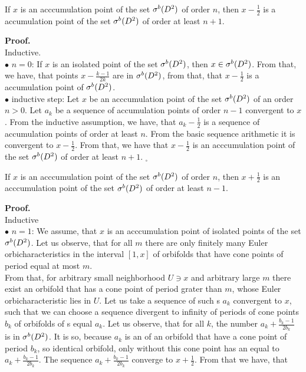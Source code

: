 \begin{lemma}\label{first_order_lemma}
If $x$ is an acccumulation point of the set ${\mathcal{\sigma}^b(D^2)}$ of order $n$, then $x-\frac{1}{2}$ is a
 accumulation point of the set ${\mathcal{\sigma}^b(D^2)}$ of order at least $n+1$. 
\end{lemma}
\textbf{Proof.} \\
Inductive. \\
$\bullet$ $n = 0$: If $x$ is an isolated point of the set ${\mathcal{\sigma}^b(D^2)}$, then $x \in {\mathcal{\sigma}^b(D^2)}$. From that, we 
have, that points $x - \frac{k-1}{2k}$ are in ${\mathcal{\sigma}^b(D^2)}$, from that, that $x-\frac{1}{2}$ is a 
accumulation point of ${\mathcal{\sigma}^b(D^2)}$. \\
$\bullet$ inductive step: Let $x$ be an acccumulation point of the set ${\mathcal{\sigma}^b(D^2)}$ of an order $n > 0$. 
Let $a_k$ be a sequence of accumulation points of order $n-1$ convergent to $x$. From the 
inductive assumption, we have, that $a_k - \frac{1}{2}$ is a sequence of accumulation points 
of order at least $n$. From the basic sequence arithmetic it is convergent to $x-\frac{1}{2}$. 
From that, we have that $x-\frac{1}{2}$ is an acccumulation point of the set ${\mathcal{\sigma}^b(D^2)}$ of order 
at least $n+1$. $_\square$
\begin{lemma}\label{second_order_lemma}
If $x$ is an acccumulation point of the set ${\mathcal{\sigma}^b(D^2)}$ of order $n$, then $x+\frac{1}{2}$ is 
an acccumulation point of the set ${\mathcal{\sigma}^b(D^2)}$ of order at least $n-1$.  
\end{lemma}
\noindent\textbf{Proof.} \\
Inductive \\
$\bullet$ $n = 1$: We assume, that $x$ is an acccumulation point of isolated points of the set 
${\mathcal{\sigma}^b(D^2)}$. Let us observe, that for all $m$ there are only finitely many Euler orbicharacteristics 
in the interval $[1,x]$ of orbifolds that have cone points of period equal at most $m$. \\ 
From that, for arbitrary small neighborhood $U \ni x$ and arbitrary large $m$ there exist an orbifold 
that has a cone point of period grater than $m$, whose Euler orbicharacteristic lies in $U$. 
Let us take a sequence of such \Eoc s $a_k$ convergent to $x$, such that we can choose 
a sequence divergent to infinity of periods of cone points $b_k$ of orbifolds of \Eoc s equal $a_k$. 
Let us observe, that for all $k$, the number $a_k+\frac{b_k-1}{2b_k}$ is in ${\mathcal{\sigma}^b(D^2)}$. 
It is so, because $a_k$ is an \Eoc of an orbifold that have a cone point of period $b_k$, so 
identical orbifold, only without this cone point has an \Eoc equal to $a_k + \frac{b_k-1}{2b_k}$. 
The sequence $a_k + \frac{b_k-1}{2b_k}$ converge to $x+\frac{1}{2}$. From that we have, that 
